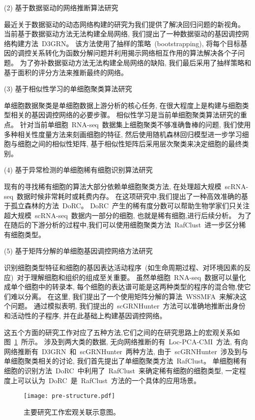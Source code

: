 (2) 基于数据驱动的网络推断算法研究

最近关于数据驱动的动态网络构建的研究为我们提供了解决回归问题的新视角。
当前基于数据驱动方法无法构建全局网络,
我们提出了一种数据驱动的基因调控网络构建方法~D3GRN。
该方法使用了抽样的策略~(bootstrapping),
将每个目标基因的调控关系转化为函数分解问题并利用揭示网络相互作用的算法解决各个子问题。
为了弥补数据驱动方法无法构建全局网络的缺陷,
我们最后采用了抽样策略和基于面积的评分方法来推断最终的网络。


(3) 基于相似性学习的单细胞聚类算法研究

单细胞数据聚类是单细胞数据上游分析的核心任务, 
在很大程度上是构建与细胞类型相关的基因调控网络的必要步骤。
相似性学习是当前单细胞聚类算法研究的重点。
针对当前单细胞~RNA-seq~数据集上细胞聚类不够准确鲁棒的问题,
我们使用多种相关性度量方法来刻画细胞的特征, 
然后使用随机森林回归模型进一步学习细胞与细胞之间的相似性矩阵,
基于相似性矩阵后采用层次聚类来决定细胞的最终类别。

(4) 基于异常检测的单细胞稀有细胞识别算法研究

现有的寻找稀有细胞的算法大部分依赖单细胞聚类方法,
在处理超大规模~scRNA-seq~数据时候非常耗时或耗费内存。
在这项研究中,我们提出了一种高效准确的基于孤立森林的方法~DoRC。
DoRC~产生的稀有度分数可以帮助生物学家们只关注超大规模~scRNA-seq~数据内一部分的细胞, 也就是稀有细胞,进行后续分析。
为了在随后的下游分析的过程中,我们可以使用细胞聚类方法~RafClust~进一步区分稀有细胞类型。

(5) 基于矩阵分解的单细胞基因调控网络方法研究

识别细胞类型特征和细胞的基因表达活动程序~(如生命周期过程、对环境因素的反应)~对于理解细胞和组织的组成至关重要。
虽然单细胞~RNA-seq~数据可以量化成单个细胞中的转录本,
每个细胞的表达谱可能是这两种类型的程序的混合物,使它们难以分离。
在这里, 我们提出了一个使用矩阵分解的算法~WSSMFA~来解决这个问题。
通过模拟表明, 我们提出的~scGRNHunter~方法可以准确地推断出身份和活动性的子程序, 
并在此基础上构建基因调控网络。

这五个方面的研究工作对应了五种方法,它们之间的在研究思路上的宏观关系如图~\ref{fig:pre-structure}~所示。
涉及到两大类的数据, 无向网络推断的有~Loc-PCA-CMI~方法, 有向网络推断有~D3GRN~和~scGRNHunter~两种方法, 
由于~scGRNHunter~涉及到与单细胞聚类相关的讨论, 我们首先提出了单细胞聚类方法~RafClust。
单细胞稀有细胞的识别方法~DoRC~中利用了~RafClust~来确定稀有细胞的细胞类型,
一定程度上可以认为~DoRC~是~RafClust~方法的一个具体的应用场景。
\begin{figure}[!htbp]
    \centering
    \texttt{[image: pre-structure.pdf]}
    \caption{主要研究工作宏观关联示意图。
    }
    \label{fig:pre-structure}
\end{figure}

